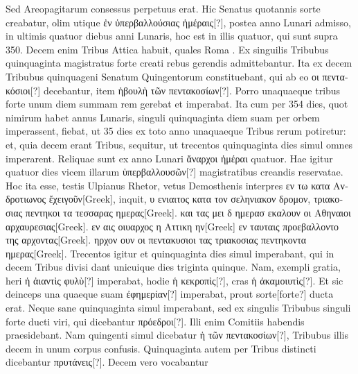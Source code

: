 Sed Areopagitarum consessus perpetuus erat.
Hic Senatus
quotannis sorte creabatur, olim utique \textgreek{ἐν ὑπερβαλλούσιας ἡμέραις[?]},
postea anno Lunari admisso, in ultimis quatuor diebus anni
Lunaris, hoc est in illis quatuor, qui sunt supra 350.
Decem
enim Tribus Attica habuit, quales Roma .
Ex singuilis Tribubus
quinquaginta magistratus forte creati rebus gerendis admittebantur.
Ita ex decem Tribubus quinquageni Senatum Quingentorum
constituebant, qui ab eo \textgreek{οι πεντακόσιοι[?]} decebantur,
 item \textgreek{ἡβουλὴ
τῶν πεντακοσίων[?]}.
Porro unaquaeque tribus forte unum diem summam
rem gerebat et imperabat.
Ita cum per 354 dies, quot nimirum
habet annus Lunaris, singuli quinquaginta diem suam per
orbem imperassent, fiebat, ut 35 dies ex toto anno unaquaeque Tribus
rerum potiretur: et, quia decem erant Tribus, sequitur, ut trecentos
quinquaginta dies simul omnes imperarent.
Reliquae sunt ex anno
Lunari \textgreek{ἄναρχοι ἡμέραι} quatuor.
Hae igitur quatuor dies vicem illarum
\textgreek{ὑπερβαλλουσῶν[?]} magistratibus creandis reservatae.
Hoc ita esse, testis Ulpianus
Rhetor, vetus Demosthenis interpres
 \textgreek{εν τω κατα Ανδροτιωνος ἔχειγοῦν[Greek]},
inquit,
 \textgreek{υ ενιαιτος κατα τον σεληνιακον δρομον, τριακοσιας πεντηκοι τα τεσσαρας
ημερας[Greek]}.
\textgreek{και τας μει δ ημερασ εκαλουν οι Αθηναιοι αρχαυρεσιας[Greek]}.
\textgreek{εν
αις οιυαρχος η Αττικη ην[Greek]}
\textgreek{εν ταυταις προεβαλλοντο της αρχοντας[Greek]}.
\textgreek{ηρχον ουν
οι πεντακυσιοι τας τριακοσιας πεντηκοντα ημερας[Greek]}.
Trecentos igitur et
quinquaginta dies simul imperabant, qui in decem Tribus divisi dant
unicuique dies triginta quinque.
Nam, exempli gratia, heri \textgreek{ἡ ἀιαντὶς φυλὺ[?]}
imperabat, hodie \textgreek{ἡ κεκροπὶς[?]}, cras \textgreek{ἡ ἀκαμοιυτὶς[?]}.
Et sic deinceps una quaeque
suam \textgreek{ἐφημερίαν[?]} imperabat, prout sorte[forte?] ducta erat.
Neque sane quinquaginta
simul imperabant, sed ex singulis Tribubus singuli forte
ducti viri, qui dicebantur \textgreek{πρόεδροι[?]}.
Illi enim Comitiis habendis praesidebant.
Nam quingenti simul dicebatur \textgreek{ἡ τῶν πεντακοσίων[?]}, Tribubus
illis decem in unum corpus confusis.
Quinquaginta autem
per Tribus distincti dicebantur \textgreek{πρυτάνεις[?]}.
Decem vero vocabantur
